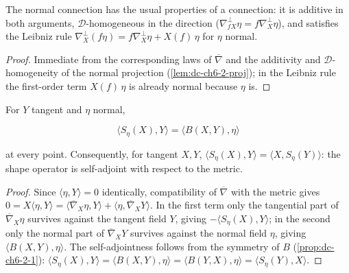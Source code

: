 \begin{proposition}
  \label{prop:dc-ch6-3-normal-connection-laws}
  \leanok
  The normal connection has the usual properties of a connection: it is
  additive in both arguments, $\mathcal{D}$-homogeneous in the direction
  ($\nabla^\perp_{fX}\eta=f\nabla^\perp_X\eta$), and satisfies the Leibniz rule
  $\nabla^\perp_X(f\eta)=f\nabla^\perp_X\eta+X(f)\,\eta$ for $\eta$ normal.
\end{proposition}
\begin{proof}
  \leanok
  \sketch
  Immediate from the corresponding laws of $\overline{\nabla}$ and the
  additivity and $\mathcal{D}$-homogeneity of the normal projection
  (\cref{lem:dc-ch6-2-proj}); in the Leibniz rule the first-order term
  $X(f)\,\eta$ is already normal because $\eta$ is.
\end{proof}

\begin{lemma}
  \label{lem:dc-ch6-3-weingarten}
  \leanok
  For $Y$ tangent and $\eta$ normal,

  $$
  \langle S_\eta(X),Y\rangle=\langle B(X,Y),\eta\rangle
  $$

  at every point. Consequently, for tangent $X,Y$,
  $\langle S_\eta(X),Y\rangle=\langle X,S_\eta(Y)\rangle$: the shape operator
  is self-adjoint with respect to the metric.
\end{lemma}
\begin{proof}
  \leanok
  \sketch
  Since $\langle\eta,Y\rangle=0$ identically, compatibility of
  $\overline{\nabla}$ with the metric gives
  $0=X\langle\eta,Y\rangle
  =\langle\overline{\nabla}_X\eta,Y\rangle+\langle\eta,\overline{\nabla}_XY\rangle$.
  In the first term only the tangential part of $\overline{\nabla}_X\eta$
  survives against the tangent field $Y$, giving $-\langle S_\eta(X),Y\rangle$;
  in the second only the normal part of $\overline{\nabla}_XY$ survives against
  the normal field $\eta$, giving $\langle B(X,Y),\eta\rangle$. The
  self-adjointness follows from the symmetry of $B$
  (\cref{prop:dc-ch6-2-1}):
  $\langle S_\eta(X),Y\rangle=\langle B(X,Y),\eta\rangle
  =\langle B(Y,X),\eta\rangle=\langle S_\eta(Y),X\rangle$.
\end{proof}

